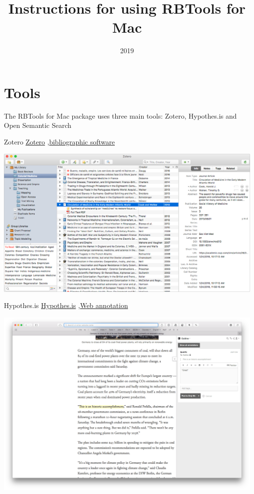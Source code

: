 \documentclass[10pt,a4paper]{article}
\title{Instructions for using RBTools for Mac}
\date{2019}
\begin{document}
\small

\maketitle
\thispagestyle{empty}
\scriptsize
\tableofcontents



\newpage

\section{Tools}

The RBTools for Mac package uses three main tools: Zotero, Hypothes.is and Open Semantic Search

\vspace{0.5cm}

\begin{textbox}{Zotero}
 \href{https://zotero.org}{Zotero} \sep \href{https://zotero.org}{bibliographic software}

\includegraphics[width=\textwidth]{zotero.png}
\end{textbox}

\begin{textbox}{Hypothes.is}
 \href{https://hypothes.is/}{Hypothes.is} \sep \href{https://hypothes.is/}{Web annotation}

\includegraphics[width=\textwidth]{Hypothesis.png}

\end{textbox}
\end{document}
